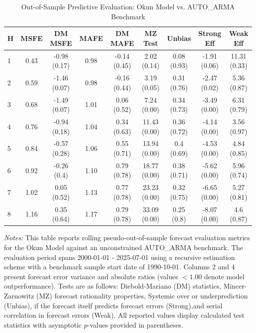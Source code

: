 \begin{table}[htbp]
\centering
\caption{Out-of-Sample Predictive Evaluation: Okun Model vs. AUTO_ARMA Benchmark}
\label{tab:okun_model_evaluation}
\footnotesize
\begin{tabular}{l cccccccc}
\hline\hline
\rule{0pt}{3ex}
\textbf{H} & \textbf{MSFE} & \textbf{DM MSFE} & \textbf{MAFE} & \textbf{DM MAFE} & \textbf{MZ Test} & \textbf{Unbias} & \textbf{Strong Eff} & \textbf{Weak Eff} \\[0.5ex]
\hline
\rule{0pt}{2.5ex}
1 & 0.43 & -0.98 (0.17) & 0.98 & -0.14 (0.45) & 2.02 (0.14) & 0.08 (0.93) & -1.91 (0.06) & 11.31 (0.33) \\
2 & 0.59 & -1.46 (0.07) & 0.98 & -0.16 (0.44) & 3.19 (0.05) & 0.31 (0.76) & -2.47 (0.02) & 5.36 (0.87) \\
3 & 0.68 & -1.49 (0.07) & 1.01 & 0.06 (0.52) & 7.24 (0.00) & 0.34 (0.73) & -3.49 (0.00) & 6.31 (0.79) \\
4 & 0.76 & -0.94 (0.18) & 1.04 & 0.34 (0.63) & 11.43 (0.00) & 0.36 (0.72) & -4.14 (0.00) & 3.56 (0.97) \\
5 & 0.84 & -0.57 (0.28) & 1.06 & 0.55 (0.71) & 13.94 (0.00) & 0.4 (0.69) & -4.53 (0.00) & 4.84 (0.85) \\
6 & 0.92 & -0.26 (0.4) & 1.10 & 0.79 (0.78) & 18.77 (0.00) & 0.38 (0.71) & -5.62 (0.00) & 5.96 (0.74) \\
7 & 1.02 & 0.05 (0.52) & 1.13 & 0.77 (0.78) & 23.23 (0.00) & 0.32 (0.75) & -6.65 (0.00) & 5.27 (0.81) \\
8 & 1.16 & 0.35 (0.64) & 1.17 & 0.79 (0.78) & 33.09 (0.00) & 0.25 (0.8) & -8.07 (0.00) & 4.6 (0.87) \\
\hline\hline
\end{tabular}%
\par\smallskip
\parbox{\textwidth}{\scriptsize \textit{Notes:} This table reports rolling pseudo-out-of-sample forecast evaluation metrics for the Okun Model against an unconstrained AUTO_ARMA benchmark. The evaluation period spans 2000-01-01 - 2025-07-01 using a recursive estimation scheme with a benchmark sample start date of 1990-10-01. Columns 2 and 4 present forecast error variance and absolute ratios (values $< 1.00$ denote model outperformance). Tests are as follows: Diebold-Mariano (DM) statistics, Mincer-Zarnowitz (MZ) forecast rationality properties, Systemic over or underprediction (Unbias), if the forecast itself predicts forecast errors (Strong),and serial correlation in forecast errors (Weak). All reported values display calculated test statistics with asymptotic $p$-values provided in parentheses.}
\end{table}
